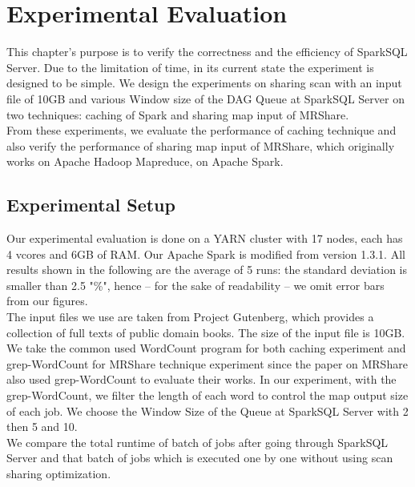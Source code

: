 
\chapter{Experimental Evaluation} %

\label{Chapter5} %


This chapter's purpose is to verify the correctness and the efficiency of SparkSQL Server. Due to the limitation of time, in its current state the experiment is designed to be simple. We design the experiments on sharing scan with an input file of 10GB and various Window size of the DAG Queue at SparkSQL Server on two techniques: caching of Spark and sharing map input of MRShare.\\
From these experiments, we evaluate the performance of caching technique and also verify the performance of sharing map input of MRShare, which originally works on Apache Hadoop Mapreduce, on Apache Spark.


\section{Experimental Setup}
Our experimental evaluation is done on a YARN cluster with 17 nodes, each has 4 vcores and 6GB of RAM. Our Apache Spark is modified from version 1.3.1. All results shown in the following are the average of 5 runs: the standard deviation is smaller than 2.5 "\%", hence – for the sake of readability – we omit error bars from our figures.\\
The input files we use are taken from Project Gutenberg, which provides a collection of full texts of public domain books. The size of the input file is 10GB. We take the common used WordCount program for both caching experiment and grep-WordCount for MRShare technique experiment since the paper on MRShare also used grep-WordCount to evaluate their works. In our experiment, with the grep-WordCount, we filter the length of each word to control the map output size of each job. We choose the Window Size of the Queue at SparkSQL Server with 2 then 5 and 10.\\
We compare the total runtime of batch of jobs after going through SparkSQL Server and that batch of jobs which is executed one by one without using scan sharing optimization.

